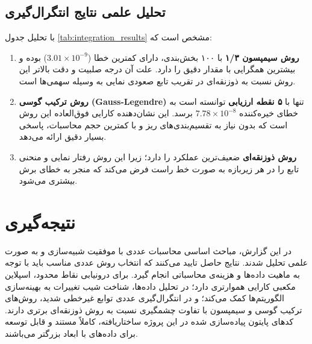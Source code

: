 \documentclass[a4paper,12pt]{article}
\begin{document}
	\subsection{تحلیل علمی نتایج انتگرال‌گیری}
	با تحلیل جدول \ref{tab:integration_results} مشخص است که:
	\begin{enumerate}
		\item \textbf{روش سیمپسون ۱/۳} با ۱۰۰ بخش‌بندی، دارای کمترین خطا ($3.01 \times 10^{-9}$) بوده و بیشترین همگرایی با مقدار دقیق را دارد. علت آن درجه صلبیت و دقت بالاتر این روش نسبت به ذوزنقه‌ای در تقریب تابع صعودی نمایی به وسیله سهمی‌ها است.
		\item \textbf{روش ترکیب گوسی (Gauss-Legendre)} تنها با \textbf{۵ نقطه ارزیابی} توانسته است به خطای خیره‌کننده $7.78 \times 10^{-8}$ برسد. این نشان‌دهنده کارایی فوق‌العاده این روش است که بدون نیاز به تقسیم‌بندی‌های ریز و با کمترین حجم محاسبات، پاسخی بسیار دقیق ارائه می‌دهد.
		\item \textbf{روش ذوزنقه‌ای} ضعیف‌ترین عملکرد را دارد؛ زیرا این روش رفتار نمایی و منحنی تابع را در هر زیربازه به صورت خط راست فرض می‌کند که منجر به خطای برش بیشتری می‌شود.
	\end{enumerate}
	
	\newpage
	
	\section{نتیجه‌گیری}
	در این گزارش، مباحث اساسی محاسبات عددی با موفقیت شبیه‌سازی و به صورت علمی تحلیل شدند. نتایج حاصل تایید می‌کنند که انتخاب روش عددی مناسب باید با توجه به ماهیت داده‌ها و هزینه‌ی محاسباتی انجام گیرد. برای درونیابی نقاط محدود، اسپلاین مکعبی کارایی هموارتری دارد؛ در تحلیل داده‌ها، شناخت شیب تغییرات به بهینه‌سازی الگوریتم‌ها کمک می‌کند؛ و در انتگرال‌گیری عددی توابع غیرخطی شدید، روش‌های ترکیب گوسی و سیمپسون با تفاوت چشمگیری نسبت به روش ذوزنقه‌ای برتری دارند. کدهای پایتون پیاده‌سازی شده در این پروژه ساختاریافته، کاملاً مستند و قابل توسعه برای داده‌های با ابعاد بزرگتر می‌باشند.
	
\end{document}
